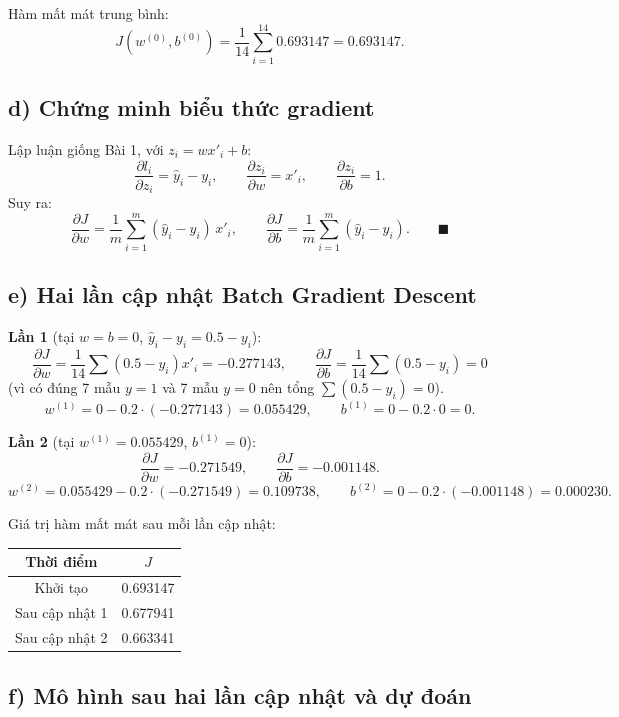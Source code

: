 \documentclass[a4paper,12pt]{article}
\begin{document}
Hàm mất mát trung bình:
\[ J(w^{(0)}, b^{(0)}) = \frac{1}{14}\sum_{i=1}^{14} 0.693147 = 0.693147. \]

\subsection*{d) Chứng minh biểu thức gradient}

Lập luận giống Bài 1, với $z_i = wx'_i + b$:
\[ \frac{\partial l_i}{\partial z_i} = \hat{y}_i - y_i, \qquad
   \frac{\partial z_i}{\partial w} = x'_i, \qquad
   \frac{\partial z_i}{\partial b} = 1. \]
Suy ra:
\[ \frac{\partial J}{\partial w}
= \frac{1}{m}\sum_{i=1}^{m}(\hat{y}_i - y_i)\,x'_i, \qquad
   \frac{\partial J}{\partial b}
= \frac{1}{m}\sum_{i=1}^{m}(\hat{y}_i - y_i). \qquad \blacksquare \]

\subsection*{e) Hai lần cập nhật Batch Gradient Descent}

\textbf{Lần 1} (tại $w = b = 0$, $\hat{y}_i - y_i = 0.5 - y_i$):
\[ \frac{\partial J}{\partial w} = \frac{1}{14}\sum(0.5-y_i)x'_i = -0.277143, \qquad
   \frac{\partial J}{\partial b} = \frac{1}{14}\sum(0.5-y_i) = 0 \]
(vì có đúng 7 mẫu $y=1$ và 7 mẫu $y=0$ nên tổng $\sum(0.5-y_i) = 0$).
\[ w^{(1)} = 0 - 0.2\cdot(-0.277143) = 0.055429, \qquad
   b^{(1)} = 0 - 0.2\cdot 0 = 0. \]

\textbf{Lần 2} (tại $w^{(1)} = 0.055429$, $b^{(1)} = 0$):
\[ \frac{\partial J}{\partial w} = -0.271549, \qquad
   \frac{\partial J}{\partial b} = -0.001148. \]
\[ w^{(2)} = 0.055429 - 0.2\cdot(-0.271549) = 0.109738, \qquad
   b^{(2)} = 0 - 0.2\cdot(-0.001148) = 0.000230. \]

Giá trị hàm mất mát sau mỗi lần cập nhật:

\begin{center}
\begin{tabular}{|c|c|}
\hline
Thời điểm & $J$ \\
\hline
Khởi tạo & 0.693147 \\
Sau cập nhật 1 & 0.677941 \\
Sau cập nhật 2 & 0.663341 \\
\hline
\end{tabular}
\end{center}

\subsection*{f) Mô hình sau hai lần cập nhật và dự đoán}
\end{document}
